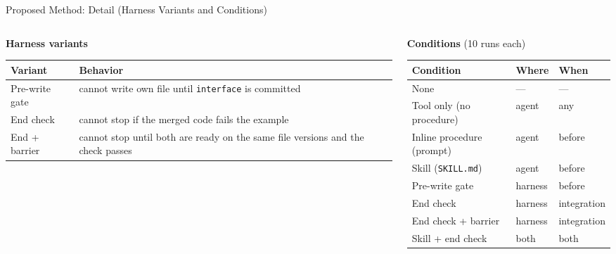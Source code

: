 \documentclass[aspectratio=169,11pt]{beamer}
\begin{document}
\begin{frame}{Proposed Method: Detail (Harness Variants and Conditions)}
  \scriptsize
  \begin{columns}[T]
    \begin{column}{0.46\textwidth}
      \textbf{Harness variants}\\[2pt]
      \begin{tabularx}{\linewidth}{l X}
        \toprule
        Variant & Behavior \\
        \midrule
        Pre-write gate & cannot write own file until \texttt{interface} is committed \\
        End check & cannot stop if the merged code fails the example \\
        End + barrier & cannot stop until both are ready on the same file versions and the check passes \\
        \bottomrule
      \end{tabularx}
    \end{column}
    \begin{column}{0.5\textwidth}
      \textbf{Conditions} (10 runs each)\\[2pt]
      \begin{tabular}{lll}
        \toprule
        Condition & Where & When \\
        \midrule
        None & --- & --- \\
        Tool only (no procedure) & agent & any \\
        Inline procedure (prompt) & agent & before \\
        Skill (\texttt{SKILL.md}) & agent & before \\
        Pre-write gate & harness & before \\
        End check & harness & integration \\
        End check + barrier & harness & integration \\
        Skill + end check & both & both \\
        \bottomrule
      \end{tabular}
    \end{column}
  \end{columns}
\end{frame}
\end{document}
